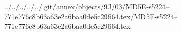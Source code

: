 ../../../../../.git/annex/objects/9J/03/MD5E-s5224--771e776c8b63a63e2a6baa0de5c29664.tex/MD5E-s5224--771e776c8b63a63e2a6baa0de5c29664.tex